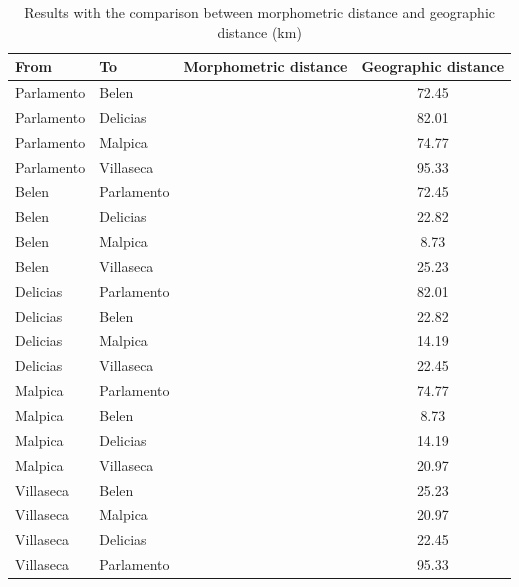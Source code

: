 \documentclass[review]{elsarticle}
\begin{document}
\begin{table}[htp]
\begin{tabular}{llcc}
\hline
 From		& To 		& Morphometric distance	& Geographic distance\\ \hline
 Parlamento	& Belen		& 						&  72.45				 \\
 Parlamento	& Delicias	& 						&  82.01				 \\
 Parlamento	& Malpica   &                       	&  74.77                      \\
 Parlamento	& Villaseca	&						&  95.33					\\
 Belen		& Parlamento &						&  72.45						\\
 Belen		& Delicias   &						&  22.82      				 \\                                    
 Belen		& Malpica	&						&  8.73							\\	
 Belen		& Villaseca  &                       &  25.23                         \\
 Delicias	& Parlamento  &                      &  82.01                            \\
 Delicias	& Belen       &						&  22.82						\\
 Delicias	& Malpica     &						&  14.19						\\
 Delicias	& Villaseca   &						&  22.45						\\
 Malpica		& Parlamento  &						&  74.77						\\
 Malpica		& Belen       &						&  8.73						\\
 Malpica		& Delicias    &						&  14.19						\\
 Malpica    & Villaseca	  &						&  20.97                     \\
 Villaseca	& Belen       &						&  25.23					     \\	             Villaseca	& Malpica     &						&  20.97								\\
 Villaseca	& Delicias	  &						&  22.45								\\
 Villaseca	& Parlamento	  &						&  95.33								\\
                                                   
\hline

\end{tabular}
\caption{Results with the comparison between morphometric distance and geographic distance (km) }
\label{table:spatgeo}
\end{table}
\end{document}
